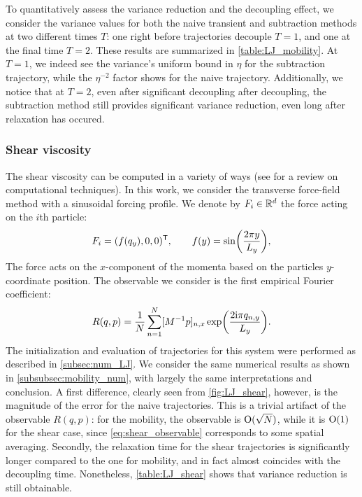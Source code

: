 To quantitatively assess the variance reduction and the decoupling effect, we consider the variance values for both the naive transient and subtraction methods at two different times $T$: one right before trajectories decouple $T=1$, and one at the final time $T=2$. These results are summarized in \cref{table:LJ_mobility}. At $T=1$, we indeed see the variance's uniform bound in $\eta$ for the subtraction trajectory, while the $\eta^{-2}$ factor shows for the naive trajectory. Additionally, we notice that at $T=2$, even after significant decoupling after decoupling, the subtraction method still provides significant variance reduction, even long after relaxation has occured.

\subsubsection{Shear viscosity}
\label{subsubsec:shear}
%
 The shear viscosity can be computed in a variety of ways (see \cite{todd_shear2007} for a review on computational techniques). In this work, we consider the transverse force-field method \cite{joubaud2012} with a sinusoidal forcing profile. We denote by $F_i\in\mathbb{R}^d$ the force acting on the $i$th particle:
%
\begin{equation}
    F_i = (f(q_y), 0, 0)^\t, \qquad  f(y) = \sin\paren*{\frac{2\pi y}{L_y}},
\end{equation}
%
The force acts on the $x$-component of the momenta based on the particles $y$-coordinate position.
%
%
%
The observable we consider is the first empirical Fourier coefficient:
%
\begin{equation}
    R(q,p) = \frac{1}{N}\sum_{n=1}^N [M^{-1}p]_{n,x}\exp\paren*{\frac{2\mathrm{i}\pi q_{n,y}}{L_y}}.
    \label{eq:shear_observable}
\end{equation}
%
The initialization and evaluation of trajectories for this system were performed as described in \cref{subsec:num_LJ}. We consider the same numerical results as shown in \cref{subsubsec:mobility_num}, with largely the same interpretations and conclusion. A first difference, clearly seen from \cref{fig:LJ_shear}, however, is the magnitude of the error for the naive trajectories. This is a trivial artifact of the observable $R(q,p)$: for the mobility, the observable is $\mathrm{O}(\sqrt{N})$, while it is $\mathrm{O}(1)$ for the shear case, since \eqref{eq:shear_observable} corresponds to some spatial averaging. Secondly, the relaxation time for the shear trajectories is significantly longer compared to the one for mobility, and in fact almost coincides with the decoupling time. Nonetheless, \cref{table:LJ_shear} shows that variance reduction is still obtainable.
%

